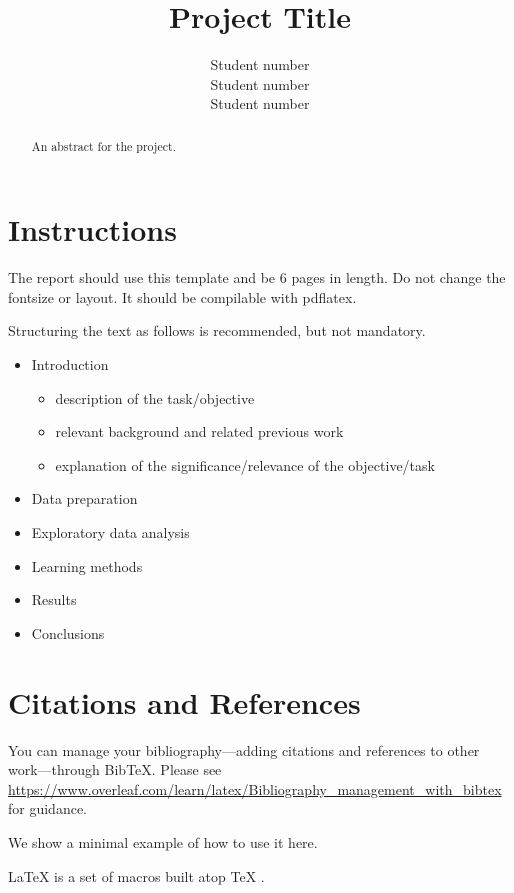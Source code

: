 \documentclass{article}
\title{Project Title}
\author{
  Student number\\
  \And
  Student number\\
 \And
  Student number\\
}
\begin{document}
\maketitle

\begin{abstract}
 An abstract for the project.
\end{abstract}

\section{Instructions}

The report should use this template and be 6 pages in length. Do not change the fontsize or layout. It should be compilable with pdflatex.

Structuring the text as follows is recommended, but not mandatory. 

\begin{itemize}
\item Introduction
  \begin{itemize}
  \item description of the task/objective
  \item relevant background and related previous work
  \item explanation of the significance/relevance of the        objective/task
  \end{itemize}
\item Data preparation
\item Exploratory data analysis
\item Learning methods
\item Results
\item Conclusions
\end{itemize}

\section*{Citations and References}
You can manage your bibliography---adding citations and references to other work---through BibTeX.
Please see \url{https://www.overleaf.com/learn/latex/Bibliography_management_with_bibtex} for guidance.

We show a minimal example of how to use it here.

\LaTeX{} \cite{latex2e} is a set of macros built atop \TeX{} \cite{texbook}.



\end{document}
